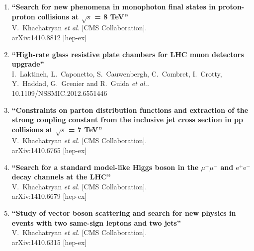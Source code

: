 \documentclass{article}
\begin{document}
\begin{enumerate}


\item%
{\bf ``Search for new phenomena in monophoton final states in proton-proton collisions at $\sqrt{s}$ = 8 TeV''}
  \\{}V.~Khachatryan {\it et al.}  [CMS Collaboration].
  \\{}arXiv:1410.8812 [hep-ex]
  


\item%
{\bf ``High-rate glass resistive plate chambers for LHC muon detectors upgrade''}
  \\{}I.~Laktineh, L.~Caponetto, S.~Cauwenbergh, C.~Combret, I.~Crotty, Y.~Haddad, G.~Grenier and R.~Guida {\it et al.}.
    \\{}10.1109/NSSMIC.2012.6551446



\item%
{\bf ``Constraints on parton distribution functions and extraction of the strong coupling constant from the inclusive jet cross section in pp collisions at $\sqrt{s}$ = 7 TeV''}
  \\{}V.~Khachatryan {\it et al.}  [CMS Collaboration].
  \\{}arXiv:1410.6765 [hep-ex]
  


\item%
{\bf ``Search for a standard model-like Higgs boson in the $\mu^+\mu^-$ and $\mathrm{e^+e^-}$ decay channels at the LHC''}
  \\{}V.~Khachatryan {\it et al.}  [CMS Collaboration].
  \\{}arXiv:1410.6679 [hep-ex]
  


\item%
{\bf ``Study of vector boson scattering and search for new physics in events with two same-sign leptons and two jets''}
  \\{}V.~Khachatryan {\it et al.}  [CMS Collaboration].
  \\{}arXiv:1410.6315 [hep-ex]
  

\end{enumerate}
\end{document}
